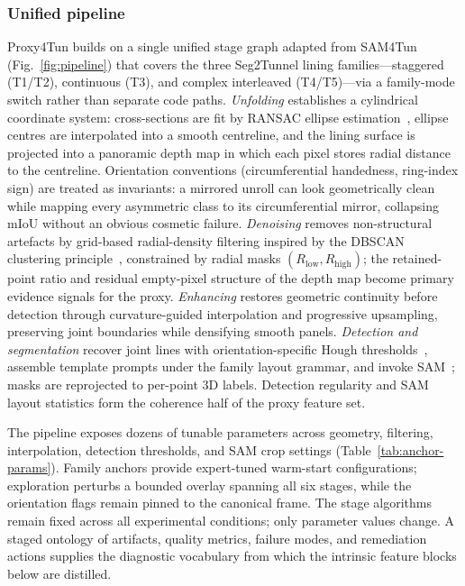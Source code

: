 \documentclass[a4paper,fleqn]{cas-dc}
\begin{document}
\subsubsection{Unified pipeline}\label{sec:pipeline}

Proxy4Tun builds on a single unified stage graph adapted from SAM4Tun~\cite{ye2025sam4tun} (Fig.~\ref{fig:pipeline}) that covers the three Seg2Tunnel lining families---staggered (T1/T2), continuous (T3), and complex interleaved (T4/T5)---via a family-mode switch rather than separate code paths. \emph{Unfolding} establishes a cylindrical coordinate system: cross-sections are fit by RANSAC ellipse estimation~\cite{fischler1981ransac}, ellipse centres are interpolated into a smooth centreline, and the lining surface is projected into a panoramic depth map in which each pixel stores radial distance to the centreline. Orientation conventions (circumferential handedness, ring-index sign) are treated as invariants: a mirrored unroll can look geometrically clean while mapping every asymmetric class to its circumferential mirror, collapsing mIoU without an obvious cosmetic failure. \emph{Denoising} removes non-structural artefacts by grid-based radial-density filtering inspired by the DBSCAN clustering principle~\cite{ester1996dbscan}, constrained by radial masks $(R_\mathrm{low}, R_\mathrm{high})$; the retained-point ratio and residual empty-pixel structure of the depth map become primary evidence signals for the proxy. \emph{Enhancing} restores geometric continuity before detection through curvature-guided interpolation and progressive upsampling, preserving joint boundaries while densifying smooth panels. \emph{Detection and segmentation} recover joint lines with orientation-specific Hough thresholds~\cite{duda1972hough}, assemble template prompts under the family layout grammar, and invoke SAM~\cite{kirillov2023sam}; masks are reprojected to per-point 3D labels. Detection regularity and SAM layout statistics form the coherence half of the proxy feature set.

The pipeline exposes dozens of tunable parameters across geometry, filtering, interpolation, detection thresholds, and SAM crop settings (Table~\ref{tab:anchor-params}). Family anchors provide expert-tuned warm-start configurations; exploration perturbs a bounded overlay spanning all six stages, while the orientation flags remain pinned to the canonical frame. The stage algorithms remain fixed across all experimental conditions; only parameter values change. A staged ontology of artifacts, quality metrics, failure modes, and remediation actions supplies the diagnostic vocabulary from which the intrinsic feature blocks below are distilled.
\end{document}
